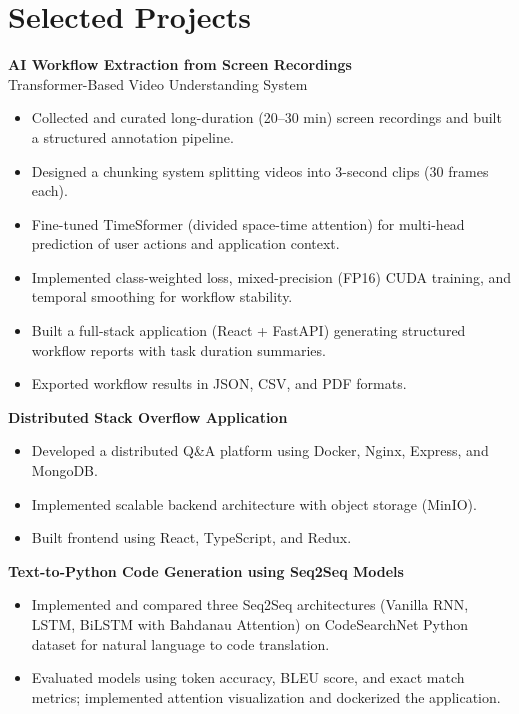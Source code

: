 \documentclass[11pt,a4paper]{article}
\begin{document}

\section*{Selected Projects}

\textbf{AI Workflow Extraction from Screen Recordings} \\
Transformer-Based Video Understanding System
\begin{itemize}
    \item Collected and curated long-duration (20--30 min) screen recordings and built a structured annotation pipeline.
    \item Designed a chunking system splitting videos into 3-second clips (30 frames each).
    \item Fine-tuned TimeSformer (divided space-time attention) for multi-head prediction of user actions and application context.
    \item Implemented class-weighted loss, mixed-precision (FP16) CUDA training, and temporal smoothing for workflow stability.
    \item Built a full-stack application (React + FastAPI) generating structured workflow reports with task duration summaries.
    \item Exported workflow results in JSON, CSV, and PDF formats.
\end{itemize}

\textbf{Distributed Stack Overflow Application}
\begin{itemize}
    \item Developed a distributed Q\&A platform using Docker, Nginx, Express, and MongoDB.
    \item Implemented scalable backend architecture with object storage (MinIO).
    \item Built frontend using React, TypeScript, and Redux.
\end{itemize}

\textbf{Text-to-Python Code Generation using Seq2Seq Models}
\begin{itemize}
    \item Implemented and compared three Seq2Seq architectures (Vanilla RNN, LSTM, BiLSTM with Bahdanau Attention) on CodeSearchNet Python dataset for natural language to code translation.
    \item Evaluated models using token accuracy, BLEU score, and exact match metrics; implemented attention visualization and dockerized the application.
\end{itemize}
\end{document}
